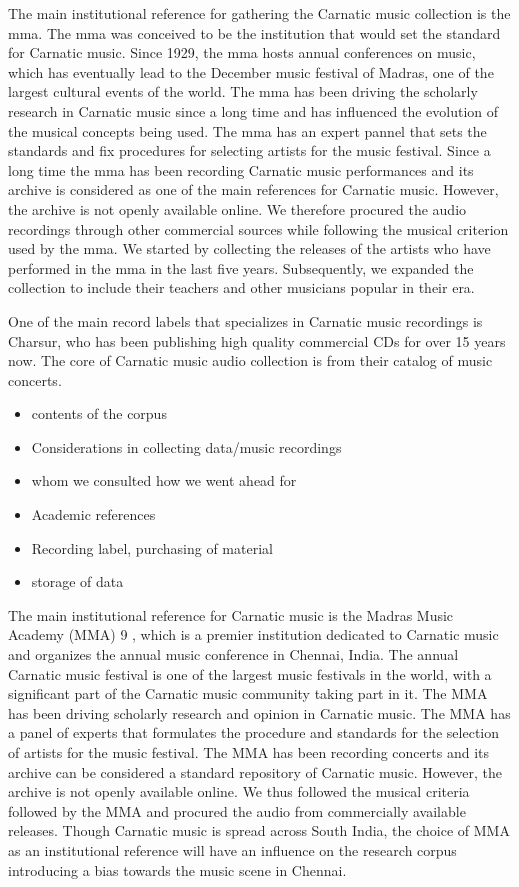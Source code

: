 The main institutional reference for gathering the Carnatic music collection is the \gls{mma}. The \Gls{mma} was conceived to be the institution that would set the standard for Carnatic music. Since 1929, the \Gls{mma} hosts annual conferences on music, which has eventually lead to the December music festival of Madras, one of the largest cultural events of the world. The \gls{mma} has been driving the scholarly research in Carnatic music since a long time and has influenced the evolution of the musical concepts being used. The \gls{mma} has an expert pannel that sets the standards and fix procedures for selecting artists for the music festival. Since a long time the \gls{mma} has been recording Carnatic music performances and its archive is considered as one of the main references for Carnatic music. However, the archive is not openly available online. We therefore procured the audio recordings through other commercial sources while following the musical criterion used by the \gls{mma}. We started by collecting the releases of the artists who have performed in the \gls{mma} in the last five years. Subsequently, we expanded the collection to include their teachers and other musicians popular in their era. 

One of the main record labels that specializes in Carnatic music recordings is Charsur, who has been publishing high quality commercial CDs for over 15 years now. The core of Carnatic music audio collection is from their catalog of music concerts. 
  

\begin{itemize}
	\item contents of the corpus
	\item Considerations in collecting data/music recordings
	\item whom we consulted how we went ahead for 
	\item Academic references
	\item Recording label, purchasing of material
	\item storage of data
	
\end{itemize}




The main institutional reference for Carnatic music
is the Madras Music Academy (MMA) 9
, which is a premier
institution dedicated to Carnatic music and organizes
the annual music conference in Chennai, India. The annual
Carnatic music festival is one of the largest music festivals
in the world, with a significant part of the Carnatic
music community taking part in it. The MMA has been
driving scholarly research and opinion in Carnatic music.
The MMA has a panel of experts that formulates the procedure
and standards for the selection of artists for the music
festival. The MMA has been recording concerts and its
archive can be considered a standard repository of Carnatic
music. However, the archive is not openly available online.
We thus followed the musical criteria followed by the
MMA and procured the audio from commercially available
releases. Though Carnatic music is spread across South India,
the choice of MMA as an institutional reference will
have an influence on the research corpus introducing a bias
towards the music scene in Chennai.

